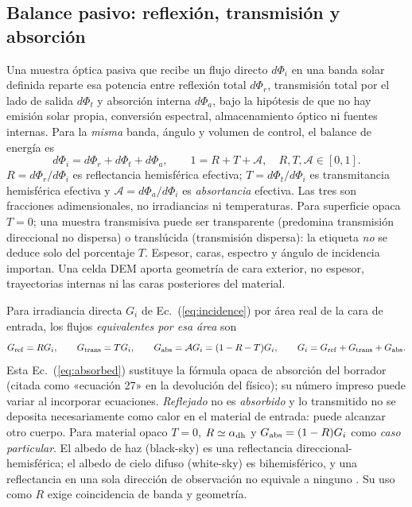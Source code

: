 \documentclass[11pt,a4paper]{article}
\begin{document}
\subsection{Balance pasivo: reflexión, transmisión y absorción}
Una muestra óptica pasiva que recibe un flujo directo $d\Phi_i$ en una banda solar definida reparte esa potencia entre reflexión total $d\Phi_r$, transmisión total por el lado de salida $d\Phi_t$ y absorción interna $d\Phi_a$, bajo la hipótesis de que no hay emisión solar propia, conversión espectral, almacenamiento óptico ni fuentes internas. Para la \emph{misma} banda, ángulo y volumen de control, el balance de energía es \cite{nisttrans}
\begin{equation}
 d\Phi_i=d\Phi_r+d\Phi_t+d\Phi_a,\qquad
 1=R+T+\mathcal A,\quad R,T,\mathcal A\in[0,1].\label{eq:balance}
\end{equation}
$R=d\Phi_r/d\Phi_i$ es reflectancia hemisférica efectiva; $T=d\Phi_t/d\Phi_i$ es transmitancia hemisférica efectiva y $\mathcal A=d\Phi_a/d\Phi_i$ es \emph{absortancia} efectiva. Las tres son fracciones adimensionales, no irradiancias ni temperaturas. Para superficie opaca $T=0$; una muestra transmisiva puede ser transparente (predomina transmisión direccional no dispersa) o translúcida (transmisión dispersa): la etiqueta \emph{no} se deduce solo del porcentaje $T$. Espesor, caras, espectro y ángulo de incidencia importan. Una celda DEM aporta geometría de cara exterior, no espesor, trayectorias internas ni las caras posteriores del material.

Para irradiancia directa $G_i$ de Ec.~(\ref{eq:incidence}) por área real de la cara de entrada, los flujos \emph{equivalentes por esa área} son
\begin{equation}
 G_{\rm ref}=R G_i,\qquad G_{\rm trans}=T G_i,\qquad
 G_{\rm abs}=\mathcal A G_i=(1-R-T)G_i,\qquad
 G_i=G_{\rm ref}+G_{\rm trans}+G_{\rm abs}.\label{eq:absorbed}
\end{equation}
Esta Ec.~(\ref{eq:absorbed}) sustituye la fórmula opaca de absorción del borrador (citada como «ecuación 27» en la devolución del físico); su número impreso puede variar al incorporar ecuaciones. \emph{Reflejado} no es \emph{absorbido} y lo transmitido no se deposita necesariamente como calor en el material de entrada: puede alcanzar otro cuerpo. Para material opaco $T=0$, $R\simeq\alpha_{\rm dh}$ y $G_{\rm abs}=(1-R)G_i$ como \emph{caso particular}. El albedo de haz (black-sky) es una reflectancia direccional-hemisférica; el albedo de cielo difuso (white-sky) es bihemisférico, y una reflectancia en una sola dirección de observación no equivale a ninguno \cite{modis43}. Su uso como $R$ exige coincidencia de banda y geometría.
\end{document}
